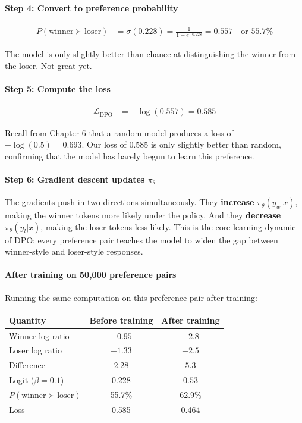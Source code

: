 \begin{chapterenv}
\paragraph{Step 4: Convert to preference probability}

\begin{align*}
P(\text{winner} \succ \text{loser}) &= \sigma(0.228) = \frac{1}{1 + e^{-0.228}} = 0.557 \quad \text{or } 55.7\%
\end{align*}

The model is only slightly better than chance at distinguishing the winner from the loser. Not great yet.

\paragraph{Step 5: Compute the loss}

\begin{align*}
\mathcal{L}_{\text{DPO}} &= -\log(0.557) = 0.585
\end{align*}

Recall from Chapter 6 that a random model produces a loss of $-\log(0.5) = 0.693$. Our loss of 0.585 is only slightly better than random, confirming that the model has barely begun to learn this preference.

\paragraph{Step 6: Gradient descent updates $\pi_\theta$}

The gradients push in two directions simultaneously. They \textbf{increase} $\pi_\theta(y_w|x)$, making the winner tokens more likely under the policy. And they \textbf{decrease} $\pi_\theta(y_l|x)$, making the loser tokens less likely. This is the core learning dynamic of DPO: every preference pair teaches the model to widen the gap between winner-style and loser-style responses.

\paragraph{After training on 50,000 preference pairs}

Running the same computation on this preference pair after training:

\begin{center}
\begin{tabular}{lcc}
\toprule
\textbf{Quantity} & \textbf{Before training} & \textbf{After training} \\
\midrule
Winner log ratio & $+0.95$ & $+2.8$ \\
Loser log ratio & $-1.33$ & $-2.5$ \\
Difference & $2.28$ & $5.3$ \\
Logit ($\beta = 0.1$) & $0.228$ & $0.53$ \\
$P(\text{winner} \succ \text{loser})$ & 55.7\% & 62.9\% \\
Loss & 0.585 & 0.464 \\
\bottomrule
\end{tabular}
\end{center}


\end{chapterenv}
